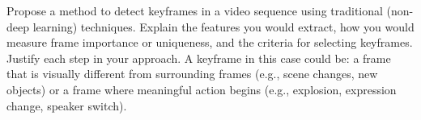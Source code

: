 \documentclass[12pt]{article}
\begin{document}
    \begin{ejercicio}[8 points]
        Propose a method to detect keyframes in a video sequence using traditional (non-deep learning) techniques. Explain the features you would extract, how you would measure frame importance or uniqueness, and the criteria for selecting keyframes. Justify each step in your approach. A keyframe in this case could be: a frame that is visually different from surrounding frames (e.g., scene changes, new objects) or a frame where meaningful action begins (e.g., explosion, expression change, speaker switch).
    \end{ejercicio}
\end{document}

